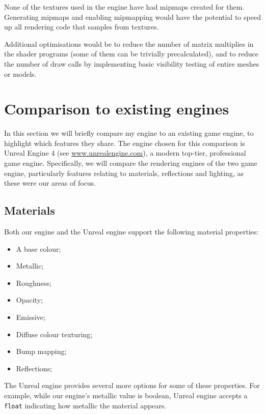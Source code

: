\documentclass[11pt]{scrartcl} %
\newcommand{\code}[1]{{\texttt{#1}}}
\begin{document}

    None of the textures used in the engine have had mipmaps created for them.
    Generating mipmaps and enabling mipmapping would have the potential to
    speed up all rendering code that samples from textures.

    Additional optimisations would be to reduce the number of matrix multiplies
    in the shader programs (some of them can be trivially precalculated), and
    to reduce the number of draw calls by implementing basic visibility testing
    of entire meshes or models.

\section{Comparison to existing engines}

    In this section we will briefly compare my engine to an existing game
    engine, to highlight which features they share. The engine chosen for this
    comparison is Unreal Engine 4 (see \url{www.unrealengine.com}), a modern
    top-tier, professional game engine. Specifically, we will compare the
    rendering engines of the two game engine, particularly features relating to
    materials, reflections and lighting, as these were our areas of focus.

    \subsection{Materials}

        Both our engine and the Unreal engine support the following material properties:

        \begin{itemize}
            \item A base colour;
            \item Metallic;
            \item Roughness;
            \item Opacity;
            \item Emissive;
            \item Diffuse colour texturing;
            \item Bump mapping;
            \item Reflections;
        \end{itemize}

        The Unreal engine provides several more options for some of these
        properties. For example, while our engine's metallic value is boolean,
        Unreal engine accepts a \code{float} indicating how metallic the
        material appears.
\end{document}
